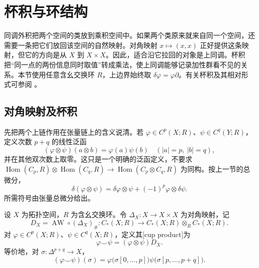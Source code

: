 
% 
% 

\section{杯积与环结构}
\label{g2:sec:0404}

同调外积把两个空间的类放到乘积空间中。如果两个类原来就来自同一个空间，还需要一条把它们放回该空间的自然映射。对角映射 \(x\mapsto(x,x)\) 正好提供这条映射，但它的方向是从 \(X\) 到 \(X\times X\)。因此，适合沿它拉回的对象是上同调。杯积把“同一点的两份信息同时取值”转成乘法，使上同调能够记录加性群看不见的关系。本节使用任意含幺交换环 \(R\)，上边界始终取 \(\delta\varphi=\varphi\partial\)。有关杯积及其相对形式可参阅 \cite[第3.2节]{Hatcher2002}。

\subsection{对角映射及杯积}
\label{g2:subsec:0404:01}

先把两个上链作用在张量链上的含义说清。若 \(\varphi\in C^p(X;R)\)、\(\psi\in C^q(Y;R)\)，定义次数 \(p+q\) 的线性泛函
\[
	(\varphi\otimes\psi)(a\otimes b)=\varphi(a)\psi(b)
	\quad(|a|=p,\ |b|=q),
\]
并在其他双次数上取零。这只是一个明确的泛函定义，不要求
\(\operatorname{Hom}(C_p,R)\otimes\operatorname{Hom}(C_q,R)\to
\operatorname{Hom}(C_p\otimes C_q,R)\) 为同构。按上一节的总微分，
\begin{equation}\label{g2:eq:tensor-cochain-coboundary}
	\delta(\varphi\otimes\psi)
	=\delta\varphi\otimes\psi+(-1)^p\varphi\otimes\delta\psi.
\end{equation}
所需符号由张量总微分给出。

\begin{definition}[杯积]\label{g2:def:cup-product}
	设 \(X\) 为拓扑空间，\(R\) 为含幺交换环。令 \(\Delta_X:X\to X\times X\) 为对角映射，记
	\[
		D_X=\operatorname{AW}\circ(\Delta_X)_\#
		:C_*(X;R)\longrightarrow C_*(X;R)\otimes_R C_*(X;R).
	\]
	对 \(\varphi\in C^p(X;R)\)、\(\psi\in C^q(X;R)\)，定义其[cup product]为
	\[
		\varphi\smile\psi=(\varphi\otimes\psi)D_X.
	\]
	等价地，对 \(\sigma:\Delta^{p+q}\to X\)，
	\begin{equation}\label{g2:eq:cup-front-back}
		(\varphi\smile\psi)(\sigma)
		=\varphi\bigl(\sigma[0,\ldots,p]\bigr)
			\psi\bigl(\sigma[p,\ldots,p+q]\bigr).
	\end{equation}
\end{definition}

